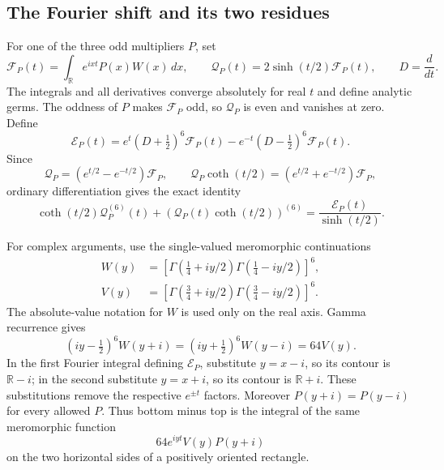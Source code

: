 \subsection{The Fourier shift and its two residues}

For one of the three odd multipliers $P$, set
\[
 \mathcal F_P(t)=\int_{\mathbb R}e^{ixt}P(x)W(x)\,dx,
 \qquad \mathcal Q_P(t)=2\sinh(t/2)\mathcal F_P(t),
 \qquad D=\frac{d}{dt}.
\]
The integrals and all derivatives converge absolutely for real $t$
and define analytic germs.  The oddness of $P$ makes $\mathcal F_P$
odd, so $\mathcal Q_P$ is even and vanishes at zero.  Define
\[
 \mathcal E_P(t)=e^t(D+\tfrac12)^6\mathcal F_P(t)
                        -e^{-t}(D-\tfrac12)^6\mathcal F_P(t).
\]
Since
\[
 \mathcal Q_P=(e^{t/2}-e^{-t/2})\mathcal F_P,
 \qquad \mathcal Q_P\coth(t/2)
              =(e^{t/2}+e^{-t/2})\mathcal F_P,
\]
ordinary differentiation gives the exact identity
\begin{equation}\label{ga:operator}
 \coth(t/2)\mathcal Q_P^{(6)}(t)
       +(\mathcal Q_P(t)\coth(t/2))^{(6)}
                  =\frac{\mathcal E_P(t)}{\sinh(t/2)}.
\end{equation}

For complex arguments, use the single-valued meromorphic continuations
\begin{align*}
 W(y)&=\left[\Gamma(\tfrac14+iy/2)
                       \Gamma(\tfrac14-iy/2)\right]^6,\\
 V(y)&=\left[\Gamma(\tfrac34+iy/2)
                       \Gamma(\tfrac34-iy/2)\right]^6.
\end{align*}
The absolute-value notation for $W$ is used only on the real axis.
Gamma recurrence gives
\begin{equation}\label{ga:recurrence}
 (iy-\tfrac12)^6W(y+i)
   =(iy+\tfrac12)^6W(y-i)=64V(y).
\end{equation}
In the first Fourier integral defining $\mathcal E_P$, substitute
$y=x-i$, so its contour is $\mathbb R-i$; in the second substitute
$y=x+i$, so its contour is $\mathbb R+i$.  These substitutions
remove the respective $e^{\pm t}$ factors.  Moreover
$P(y+i)=P(y-i)$ for every allowed $P$.  Thus bottom minus top
is the integral of the same meromorphic function
\begin{equation}\label{ga:common-integrand}
                  64e^{iyt}V(y)P(y+i)
\end{equation}
on the two horizontal sides of a positively oriented rectangle.

